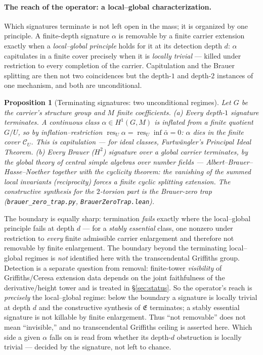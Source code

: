 \documentclass[11pt]{article}
\newtheorem{proposition}[theorem]{Proposition}
\theoremstyle{definition}
\begin{document}
\paragraph{The reach of the operator: a local--global characterization.} Which signatures terminate is not
left open in the mass; it is organized by one principle. A finite-depth signature $\alpha$ is removable by a
finite carrier extension exactly when a \emph{local--global principle} holds for it at its detection depth $d$:
$\alpha$ capitulates in a finite cover precisely when it is \emph{locally trivial} --- killed under restriction to
every completion of the carrier. Capitulation and the Brauer splitting are then not two coincidences but the
depth-$1$ and depth-$2$ instances of one mechanism, and both are unconditional.
\begin{proposition}[Terminating signatures: two unconditional regimes]\label{prop:terminating}
Let $G$ be the carrier's structure group and $M$ finite coefficients.
\textup{(a)} \emph{Every} depth-$1$ signature terminates. A continuous class $\alpha\in H^1(G,M)$ is inflated from
a finite quotient $G/U$, so by inflation--restriction $\operatorname{res}_U\alpha=\operatorname{res}_U
\operatorname{inf}\bar\alpha=0$: $\alpha$ dies in the finite cover $\mathcal C_U$. This is capitulation --- for
ideal classes, Furtw\"angler's Principal Ideal Theorem.
\textup{(b)} \emph{Every} Brauer ($H^2$) signature over a global carrier terminates, by the global theory of
central simple algebras over number fields --- Albert--Brauer--Hasse--Noether together with the cyclicity
theorem: the vanishing of the summed local invariants (reciprocity) forces a finite cyclic splitting extension. The constructive synthesis for the $2$-torsion part is the Brauer-zero trap
(\texttt{brauer\_zero\_trap.py}, \texttt{BrauerZeroTrap.lean}).
\end{proposition}
\noindent The boundary is equally sharp: termination \emph{fails} exactly where the local--global principle fails
at depth $d$ --- for a \emph{stably essential} class, one nonzero under restriction to \emph{every} finite
admissible carrier enlargement and therefore not removable by finite enlargement. The boundary beyond the
terminating local--global regimes is \emph{not} identified here with the transcendental Griffiths group.
Detection is a separate question from removal: finite-tower \emph{visibility} of Griffiths/Ceresa extension data
depends on the joint faithfulness of the derivative/height tower and is treated in \S\ref{sec:status}. So the
operator's reach is \emph{precisely} the local--global regime: below the boundary a signature is locally trivial
at depth $d$ and the constructive synthesis of $\mathfrak E$ terminates; a stably essential signature is not
killable by finite enlargement. Thus ``not removable'' does not mean ``invisible,'' and no transcendental
Griffiths ceiling is asserted here. Which side a given $\alpha$ falls on is read from whether its depth-$d$
obstruction is locally trivial --- decided by the signature, not left to chance.
\end{document}
